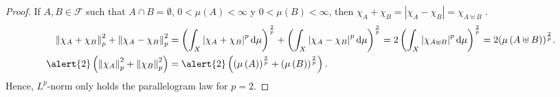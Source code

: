\begin{frame}
\begin{proof}
		If $A,B\in\mathcal{F}$ such that $A\cap B=\emptyset$,
		$0<\mu\left(A\right)<\infty$ y $0<\mu\left(B\right)<\infty$,
		then
		\begin{math}
			\chi_{A}+
			\chi_{B}=
			\left|
			\chi_{A}-
			\chi_{B}
			\right|=
			\chi_{A\uplus B}
		\end{math}
		.
		\begin{align*}
			{\left\|\chi_{A}+\chi_{B}\right\|}^{2}_{p}+
			{\left\|\chi_{A}-\chi_{B}\right\|}^{2}_{p}
			 & =
			\left(
			\int_{X}
			{\left|
				\chi_{A}+
				\chi_{B}
				\right|}
			^{p}
			\dl\mu
			\right)^{\frac{2}{p}}
			+
			\left(
			\int_{X}
			{\left|
				\chi_{A}-
				\chi_{B}
				\right|}
			^{p}
			\dl\mu
			\right)^{\frac{2}{p}}
			=
			2\left(
			\int_{X}
			{\left|
				\chi_{A\uplus B}
				\right|}
			^{p}
			\dl\mu
			\right)^{\frac{2}{p}}
			=
			2
				{
					\left(
					\mu
					\left(
					A\uplus B
					\right)
					\right)
					^{\frac{2}{p}}
				}.
			\\
			\alert{2}\left(
			{\left\|\chi_{A}\right\|}^{2}_{p}
			+
			{\left\|\chi_{B}\right\|}^{2}_{p}
			\right)
			 & =
			\alert{2}
			\left(
			{
				\left(
				\mu\left(A\right)
				\right)
			}
			^{\frac{2}{p}}
			+
			{
				\left(
				\mu\left(B\right)
				\right)
			}
			^{\frac{2}{p}}
			\right).
		\end{align*}
		Hence, $L^{p}$-norm only holds the \alert{parallelogram law} for
		$p=2$.
	\end{proof}
\end{frame}

